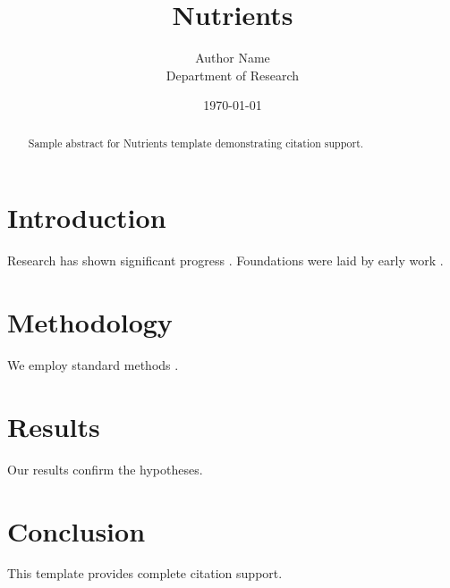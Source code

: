 \documentclass{mdpi}
\title{Nutrients}
\author{Author Name \\ \small Department of Research}
\date{\today}
\begin{document}
\maketitle

\begin{abstract}
Sample abstract for Nutrients template demonstrating citation support.
\end{abstract}

\section{Introduction}
Research has shown significant progress \citep{einstein1905}. Foundations were laid by early work \citep{turing1950}.

\section{Methodology}
We employ standard methods \citep{knuth1984}.

\section{Results}
Our results confirm the hypotheses.

\section{Conclusion}
This template provides complete citation support.



\end{document}

